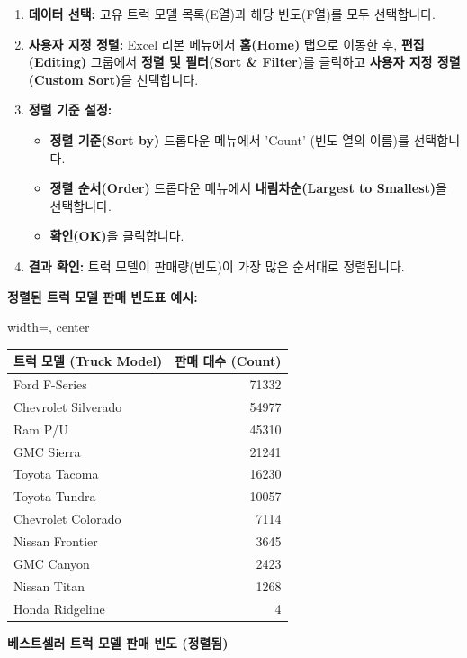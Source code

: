 \documentclass[11pt,a4paper]{book}
\providecommand{\captionof}[2]{\textbf{#2}}
\theoremstyle{definition}
\begin{document}
\begin{enumerate}
    \item \textbf{데이터 선택:} 고유 트럭 모델 목록(E열)과 해당 빈도(F열)를 모두 선택합니다.
    \item \textbf{사용자 지정 정렬:} Excel 리본 메뉴에서 \textbf{홈(Home)} 탭으로 이동한 후, \textbf{편집(Editing)} 그룹에서 \textbf{정렬 및 필터(Sort \& Filter)}를 클릭하고 \textbf{사용자 지정 정렬(Custom Sort)}을 선택합니다.
    \item \textbf{정렬 기준 설정:}
    \begin{itemize}
        \item \textbf{정렬 기준(Sort by)} 드롭다운 메뉴에서 'Count' (빈도 열의 이름)를 선택합니다.
        \item \textbf{정렬 순서(Order)} 드롭다운 메뉴에서 \textbf{내림차순(Largest to Smallest)}을 선택합니다.
        \item \textbf{확인(OK)}을 클릭합니다.
    \end{itemize}
    \item \textbf{결과 확인:} 트럭 모델이 판매량(빈도)이 가장 많은 순서대로 정렬됩니다.
\end{enumerate}

\begin{examplebox}
\textbf{정렬된 트럭 모델 판매 빈도표 예시:}
\begin{adjustbox}{width=\textwidth, center}
\begin{tabular}{lr}
\toprule
\textbf{트럭 모델 (Truck Model)} & \textbf{판매 대수 (Count)} \\
\midrule
Ford F-Series & 71332 \\
Chevrolet Silverado & 54977 \\
Ram P/U & 45310 \\
GMC Sierra & 21241 \\
Toyota Tacoma & 16230 \\
Toyota Tundra & 10057 \\
Chevrolet Colorado & 7114 \\
Nissan Frontier & 3645 \\
GMC Canyon & 2423 \\
Nissan Titan & 1268 \\
Honda Ridgeline & 4 \\
\bottomrule
\end{tabular}
\end{adjustbox}
\captionof{table}{베스트셀러 트럭 모델 판매 빈도 (정렬됨)}
\end{examplebox}
\end{document}

